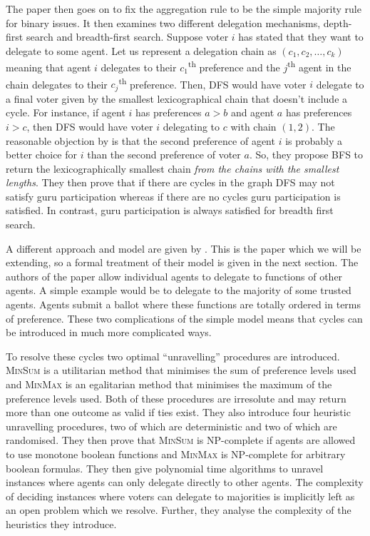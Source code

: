 \documentclass[11pt,a4paper, titlepage]{article}
\theoremstyle{definition}
\begin{document}
The paper then goes on to fix the aggregation rule to be the simple majority rule for binary issues. It then examines two different delegation mechanisms, depth-first search and breadth-first search.
Suppose voter $i$ has stated that they want to delegate to some agent. Let us represent a delegation chain as $(c_1, c_2, \ldots, c_k)$ meaning that agent $i$ delegates to their $c_1$\textsuperscript{th} preference and the $j$\textsuperscript{th} agent in the chain delegates to their $c_j$\textsuperscript{th} preference.
Then, DFS would have voter $i$ delegate to a final voter given by the smallest lexicographical chain that doesn't include a cycle. For instance, if agent $i$ has preferences $a > b$ and agent $a$ has preferences $i > c$, then DFS would have voter $i$ delegating to $c$ with chain $(1, 2)$.
The reasonable objection by \citeauthor{kotsialou} is that the second preference of agent $i$ is probably a better choice for $i$ than the second preference of voter $a$.
So, they propose BFS to return the lexicographically smallest chain \emph{from the chains with the smallest lengths}.
They then prove that if there are cycles in the graph DFS may not satisfy guru participation whereas if there are no cycles guru participation is satisfied. In contrast, guru participation is always satisfied for breadth first search.

A different approach and model are given by \citet{grandi}. This is the paper which we will be extending, so a formal treatment of their model is given in the next section.
The authors of the paper allow individual agents to delegate to functions of other agents. A simple example would be to delegate to the majority of some trusted agents.
Agents submit a ballot where these functions are totally ordered in terms of preference.
These two complications of the simple model means that cycles can be introduced in much more complicated ways.

To resolve these cycles two optimal ``unravelling'' procedures are introduced. \textsc{MinSum} is a utilitarian method that minimises the sum of preference levels used and \textsc{MinMax} is an egalitarian method that minimises the maximum of the preference levels used.
Both of these procedures are irresolute and may return more than one outcome as valid if ties exist.
They also introduce four heuristic unravelling procedures, two of which are deterministic and two of which are randomised.
They then prove that \textsc{MinSum} is NP-complete if agents are allowed to use monotone boolean functions  and \textsc{MinMax} is NP-complete for arbitrary boolean formulas.
They then give polynomial time algorithms to unravel instances where agents can only delegate directly to other agents.
The complexity of deciding instances where voters can delegate to majorities is implicitly left as an open problem which we resolve.
Further, they analyse the complexity of the heuristics they introduce.
\end{document}
